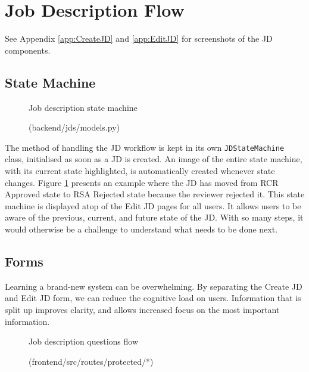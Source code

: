 \section{Job Description Flow}
\vspace{-5pt}
{\footnotesize See Appendix \ref{app:CreateJD} and \ref{app:EditJD} for screenshots of the JD components.}
\vspace{-5pt}
\subsection{State Machine}
\begin{figure}[h]
\centering
{}
\vspace{-20pt}
\caption{Job description state machine}
\vspace{-10pt}
\caption*{(backend/jds/models.py)}
\label{fig:jd-state}
\vspace{-5pt}
\end{figure}

The method of handling the JD workflow is kept in its own \texttt{JDStateMachine} class, initialised as soon as a JD is created. An image of the entire state machine, with its current state highlighted, is automatically created whenever state changes. Figure \ref{fig:jd-state} presents an example where the JD has moved from RCR Approved state to RSA Rejected state because the reviewer rejected it. This state machine is displayed atop of the Edit JD pages for all users. It allows users to be aware of the previous, current, and future state of the JD. With so many steps, it would otherwise be a challenge to understand what needs to be done next.

\subsection{Forms}
Learning a brand-new system can be overwhelming. By separating the Create JD and Edit JD form, we can reduce the cognitive load on users. Information that is split up improves clarity, and allows increased focus on the most important information. 

\begin{figure}[h]
\centering
{}
\vspace{-5pt}
\caption{Job description questions flow}
\vspace{-10pt}
\caption*{(frontend/src/routes/protected/*)}
\label{fig:jd-q-flow}
\vspace{-15pt}
\end{figure}

